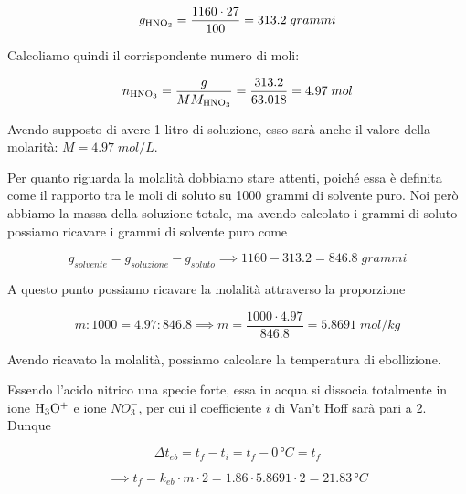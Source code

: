 $$g_{\rm HNO_3}=\frac{1160 \cdot 27}{100}=313.2\;grammi$$

Calcoliamo quindi il corrispondente numero di moli:

$$n_{\rm HNO_3}=\frac{g}{MM_{\rm HNO_3}}
=\frac{313.2}{63.018}=4.97\;mol$$

Avendo supposto di avere 1 litro di soluzione, esso sarà anche il valore della molarità: $M=4.97\;mol/L$.

\vspace{0.2cm}Per quanto riguarda la molalità dobbiamo stare attenti, poiché essa è definita come il rapporto tra le moli di soluto su 1000 grammi di solvente puro. Noi però abbiamo la massa della soluzione totale, ma avendo calcolato i grammi di soluto possiamo ricavare i grammi di solvente puro come

$$g_{solvente}=g_{soluzione} - g_{soluto}
\implies
1160 -313.2=846.8\;grammi$$

A questo punto possiamo ricavare la molalità attraverso la proporzione

$$m:1000=4.97:846.8
\implies
m=\frac{1000 \cdot 4.97}{846.8}=5.8691\;mol/kg$$

Avendo ricavato la molalità, possiamo calcolare la temperatura di ebollizione.

Essendo l'acido nitrico una specie forte, essa in acqua si dissocia totalmente in ione $\rm H_3O^+$ e ione $NO_3^-$, per cui il coefficiente $i$ di Van't Hoff sarà pari a 2. Dunque

$$\Delta t_{eb}=t_f - t_i=t_f - 0\,\text{°}C=t_f$$

$$\implies t_f=k_{eb} \cdot m \cdot 2
=1.86 \cdot 5.8691 \cdot 2=21.83\,\text{°}C$$